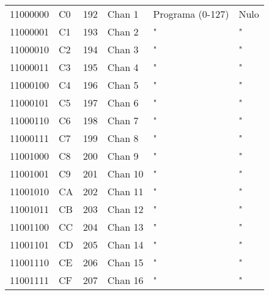 \begin{center}
\begin{supertabular}{| C{2cm} | C{1.5cm} | C{1.5cm} | C{5.3cm} | C{1.5cm} | C{1.5cm} |}
             11000000 & C0 & 192 & Chan 1   &            Programa (0-127)            &                   Nulo                      \\
                11000001 & C1 & 193 & Chan 2   &                   "                    &                    "                        \\
             11000010 & C2 & 194 & Chan 3   &                   "                    &                    "                        \\
                11000011 & C3 & 195 & Chan 4   &                   "                    &                    "                        \\
             11000100 & C4 & 196 & Chan 5   &                   "                    &                    "                        \\
                11000101 & C5 & 197 & Chan 6   &                   "                    &                    "                        \\
             11000110 & C6 & 198 & Chan 7   &                   "                    &                    "                        \\
                11000111 & C7 & 199 & Chan 8   &                   "                    &                    "                        \\
             11001000 & C8 & 200 & Chan 9   &                   "                    &                    "                        \\
                11001001 & C9 & 201 & Chan 10  &                   "                    &                    "                        \\
             11001010 & CA & 202 & Chan 11  &                   "                    &                    "                        \\
                11001011 & CB & 203 & Chan 12  &                   "                    &                    "                        \\
             11001100 & CC & 204 & Chan 13  &                   "                    &                    "                        \\
                11001101 & CD & 205 & Chan 14  &                   "                    &                    "                        \\
             11001110 & CE & 206 & Chan 15  &                   "                    &                    "                        \\
                11001111 & CF & 207 & Chan 16  &                   "                    &                    "                        \\
        \end{supertabular}
        \end{center}

